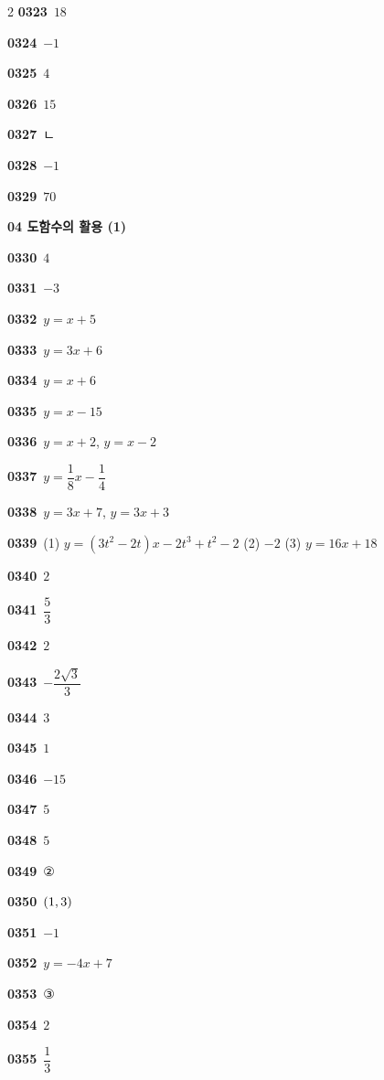 \documentclass[10pt,a4paper]{article}
\begin{document}
\begin{multicols}{2}
\noindent\textbf{0323}\ $18$\par
\noindent\textbf{0324}\ $-1$\par
\noindent\textbf{0325}\ $4$\par
\noindent\textbf{0326}\ $15$\par
\noindent\textbf{0327}\ ㄴ\par
\noindent\textbf{0328}\ $-1$\par
\noindent\textbf{0329}\ $70$\par
\noindent\textbf{04 도함수의 활용 (1)}\par\smallskip
\noindent\textbf{0330}\ $4$\par
\noindent\textbf{0331}\ $-3$\par
\noindent\textbf{0332}\ $y=x+5$\par
\noindent\textbf{0333}\ $y=3x+6$\par
\noindent\textbf{0334}\ $y=x+6$\par
\noindent\textbf{0335}\ $y=x-15$\par
\noindent\textbf{0336}\ $y=x+2$, $y=x-2$\par
\noindent\textbf{0337}\ $y=\dfrac{1}{8}x-\dfrac{1}{4}$\par
\noindent\textbf{0338}\ $y=3x+7$, $y=3x+3$\par
\noindent\textbf{0339}\ (1) $y=(3t^2-2t)x-2t^3+t^2-2$ \quad (2) $-2$ \quad (3) $y=16x+18$\par
\noindent\textbf{0340}\ $2$\par
\noindent\textbf{0341}\ $\dfrac{5}{3}$\par
\noindent\textbf{0342}\ $2$\par
\noindent\textbf{0343}\ $-\dfrac{2\sqrt{3}}{3}$\par
\noindent\textbf{0344}\ $3$\par
\noindent\textbf{0345}\ $1$\par
\noindent\textbf{0346}\ $-15$\par
\noindent\textbf{0347}\ $5$\par
\noindent\textbf{0348}\ $5$\par
\noindent\textbf{0349}\ ②\par
\noindent\textbf{0350}\ $(1{,}\mkern3mu\mathopen{}3)$\par
\noindent\textbf{0351}\ $-1$\par
\noindent\textbf{0352}\ $y=-4x+7$\par
\noindent\textbf{0353}\ ③\par
\noindent\textbf{0354}\ $2$\par
\noindent\textbf{0355}\ $\dfrac{1}{3}$\par

\end{multicols}
\end{document}
